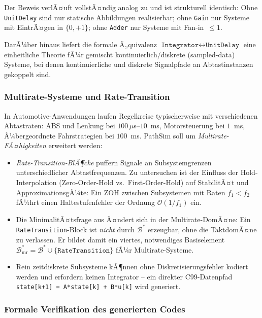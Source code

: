 ﻿\documentclass[12pt,a4paper]{article}
\theoremstyle{definition}
\begin{document}
Der Beweis verlÃ¤uft vollstÃ¤ndig analog zu  und ist
strukturell identisch: Ohne \texttt{UnitDelay} sind nur statische
Abbildungen realisierbar; ohne \texttt{Gain} nur Systeme mit EintrÃ¤gen in
$\{0,+1\}$; ohne \texttt{Adder} nur Systeme mit Fan-in~$\leq 1$.

DarÃ¼ber hinaus liefert die formale Ã„quivalenz $\texttt{Integrator}
\leftrightarrow \texttt{UnitDelay}$ eine einheitliche Theorie fÃ¼r
gemischt kontinuierlich/diskrete (sampled-data) Systeme, bei denen
kontinuierliche und diskrete Signalpfade an Abtastinstanzen gekoppelt sind.

\subsubsection{Multirate-Systeme und Rate-Transition}

In Automotive-Anwendungen laufen Regelkreise typischerweise mit
verschiedenen Abtastraten: ABS und Lenkung bei $100\,\mu$s--$10$~ms,
Motorsteuerung bei $1$~ms, Ã¼bergeordnete Fahrstrategien bei $100$~ms.
PathSim soll um \emph{Multirate-FÃ¤higkeiten} erweitert werden:

\begin{itemize}
  \item \emph{Rate-Transition-BlÃ¶cke} puffern Signale an Subsystemgrenzen
        unterschiedlicher Abtastfrequenzen. Zu untersuchen ist der Einfluss
        der Hold-Interpolation (Zero-Order-Hold vs.\ First-Order-Hold) auf
        StabilitÃ¤t und ApproximationsgÃ¼te: Ein ZOH zwischen Subsystemen mit
        Raten $f_1 < f_2$ fÃ¼hrt einen Haltestufenfehler der Ordnung
        $\mathcal{O}(1/f_1)$ ein.
  \item Die MinimalitÃ¤tsfrage aus  Ã¤ndert sich in der
        Multirate-DomÃ¤ne: Ein \texttt{RateTransition}-Block ist
        \emph{nicht} durch $\mathcal{B}^*$ erzeugbar, ohne die
        TaktdomÃ¤ne zu verlassen. Er bildet damit ein viertes, notwendiges
        Basiselement $\mathcal{B}^*_{\mathrm{mr}} = \mathcal{B}^* \cup
        \{\texttt{RateTransition}\}$ fÃ¼r Multirate-Systeme.
  \item Rein zeitdiskrete Subsysteme kÃ¶nnen ohne Diskretisierungsfehler
        kodiert werden und erfordern keinen Integrator -- ein direkter
        C99-Datenpfad \texttt{state[k+1] = A*state[k] + B*u[k]} wird generiert.
\end{itemize}

\subsubsection{Formale Verifikation des generierten Codes}
\end{document}
